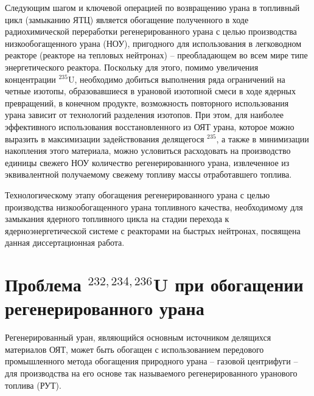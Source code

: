 Следующим шагом и ключевой операцией по возвращению урана в топливный цикл (замыканию ЯТЦ) является обогащение полученного в ходе радиохимической переработки регенерированного урана с целью производства низкообогащенного урана (НОУ), пригодного для использования в легководном реакторе (реакторе на тепловых нейтронах) -- преобладающем во всем мире типе энергетического реактора. Поскольку для этого, помимо увеличения концентрации $^{235}$U, необходимо добиться выполнения ряда ограничений на четные изотопы, образовавшиеся в урановой изотопной смеси в ходе ядерных превращений, в конечном продукте, возможность повторного использования урана зависит от технологий разделения изотопов. При этом, для наиболее эффективного использования восстановленного из ОЯТ урана, которое можно выразить в максимизации задействования делящегося $^{235}$, а также в минимизации накопления этого материала, можно условиться расходовать на производство единицы свежего НОУ количество регенерированного урана, извлеченное из эквивалентной получаемому свежему топливу массы отработавшего топлива.

Технологическому этапу обогащения регенерированного урана с целью производства низкообогащенного урана топливного качества, необходимому для замыкания ядерного топливного цикла на стадии перехода к ядерноэнергетической системе с реакторами на быстрых нейтронах, посвящена данная диссертационная работа.



\section{Проблема $^{232,234,236}$U при обогащении регенерированного урана}

Регенерированный уран, являющийся основным источником делящихся материалов ОЯТ, может быть обогащен с использованием передового промышленного метода обогащения природного урана -- газовой центрифуги -- для производства на его основе так называемого регенерированного уранового топлива (РУТ).

